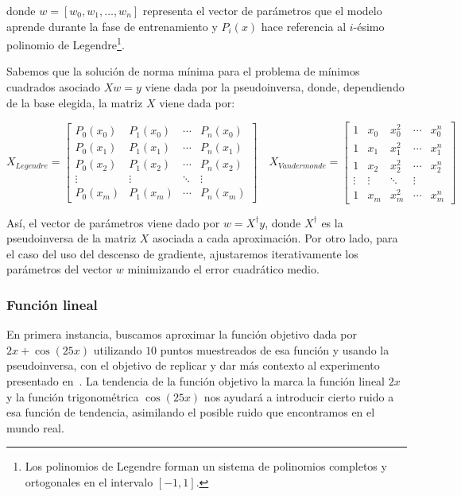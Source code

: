 donde $w = [w_0, w_1, \ldots, w_n]$ representa el vector de parámetros que el modelo aprende durante la fase de entrenamiento y $P_i(x)$ hace referencia al $i$-ésimo polinomio de Legendre\footnote{Los polinomios de Legendre forman un sistema de polinomios completos y ortogonales en el intervalo $[-1, 1]$.}.\newline


Sabemos que la solución de norma mínima para el problema de mínimos cuadrados asociado $Xw=y$ viene dada por la pseudoinversa, donde, dependiendo de la base elegida, la matriz $X$ viene dada por:

\[
    X_{Legendre} = \begin{bmatrix}
        P_0(x_0) & P_1(x_0) & \cdots & P_n(x_0) \\
        P_0(x_1) & P_1(x_1) & \cdots & P_n(x_1) \\
        P_0(x_2) & P_1(x_2) & \cdots & P_n(x_2) \\
        \vdots & \vdots &    \ddots & \vdots \\
        P_0(x_m) & P_1(x_m) & \cdots & P_n(x_m)
        \end{bmatrix}
\quad
    X_{Vandermonde} = \begin{bmatrix}
    1 & x_0 & x_0^2 &\cdots & x_0^{n} \\
    1 & x_1 & x_1^2 &\cdots & x_1^{n} \\
    1 & x_2 & x_2^2 &\cdots & x_2^{n} \\
    \vdots & \vdots &    \ddots & \vdots \\
    1 & x_m & x_m^2 &\cdots & x_m^{n}
    \end{bmatrix}
\]

Así, el vector de parámetros viene dado por $w = X^{\dagger} y$, donde $X^{\dagger}$ es la pseudoinversa de la matriz $X$ asociada a cada aproximación. Por otro lado, para el caso del uso del descenso de gradiente, ajustaremos iterativamente los parámetros del vector $w$ minimizando el error cuadrático medio.\newline

\subsubsection{Función lineal}\label{subsubsec:funcion-lineal}

En primera instancia, buscamos aproximar la función objetivo dada por $2x + \cos(25x)$ utilizando $10$ puntos muestreados de esa función y usando la pseudoinversa, con el objetivo de replicar y dar más contexto al experimento presentado en~\cite{Schaeffer2023}. La tendencia de la función objetivo la marca la función lineal $2x$ y la función trigonométrica $\cos(25x)$ nos ayudará a introducir cierto ruido a esa función de tendencia, asimilando el posible ruido que encontramos en el mundo real.\newline

